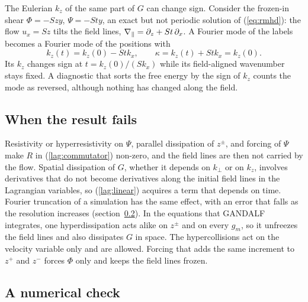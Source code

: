 The Eulerian $k_z$ of the same part of $G$ can change sign. Consider the frozen-in shear $\Phi=-Szy$, $\Psi=-Sty$, an exact but not periodic solution of (\ref{eq:rmhd}): the flow $u_x=Sz$ tilts the field lines, $\nabla_\parallel=\partial_z+St\,\partial_x$. A Fourier mode of the labels becomes a Fourier mode of the positions with
\begin{equation}\label{lag:shear}
  k_z(t)=k_z(0)-Stk_x,\qquad \kappa=k_z(t)+Stk_x=k_z(0) .
\end{equation}
Its $k_z$ changes sign at $t=k_z(0)/(Sk_x)$ while its field-aligned wavenumber stays fixed. A diagnostic that sorts the free energy by the sign of $k_z$ counts the mode as reversed, although nothing has changed along the field.

\subsection{When the result fails}\label{fr:breaks}

Resistivity or hyperresistivity on $\Psi$, parallel dissipation of $z^\pm$, and forcing of $\Psi$ make $R$ in (\ref{lag:commutator}) non-zero, and the field lines are then not carried by the flow. Spatial dissipation of $G$, whether it depends on $k_\perp$ or on $k_z$, involves derivatives that do not become derivatives along the initial field lines in the Lagrangian variables, so (\ref{lag:linear}) acquires a term that depends on time. Fourier truncation of a simulation has the same effect, with an error that falls as the resolution increases (section~\ref{fr:check}). In the equations that GANDALF integrates, one hyperdissipation acts alike on $z^\pm$ and on every $g_m$, so it unfreezes the field lines and also dissipates $G$ in space. The hypercollisions act on the velocity variable only and are allowed. Forcing that adds the same increment to $z^+$ and $z^-$ forces $\Phi$ only and keeps the field lines frozen.

\subsection{A numerical check}\label{fr:check}

